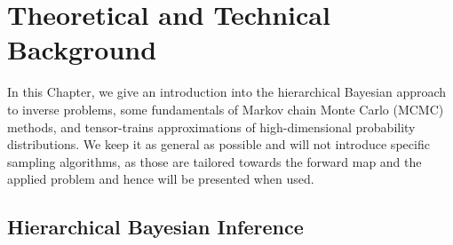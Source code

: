 \chapter{Theoretical and Technical Background}
\label{ch:background}
In this Chapter, we give an introduction into the hierarchical Bayesian approach to inverse problems, some fundamentals of Markov chain Monte Carlo (MCMC) methods, and tensor-trains approximations of high-dimensional probability distributions.
We keep it as general as possible and will not introduce specific sampling algorithms, as those are tailored towards the forward map and the applied problem and hence will be presented when used.


\section{Hierarchical Bayesian Inference}
\label{sec:bayes}
